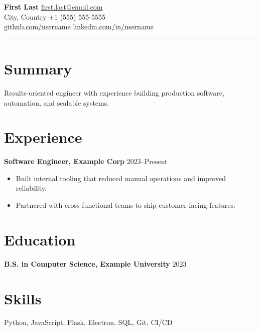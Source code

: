 \documentclass[11pt]{article}
\begin{document}
{\LARGE \textbf{First Last}} \hfill \href{mailto:first.last@email.com}{first.last@email.com} \\
City, Country \hfill +1 (555) 555-5555 \\
\href{https://github.com/username}{github.com/username} \hfill \href{https://linkedin.com/in/username}{linkedin.com/in/username}

\vspace{0.6em}
\hrule
\vspace{0.6em}

\section*{Summary}
Results-oriented engineer with experience building production software, automation, and scalable systems.

\section*{Experience}
\textbf{Software Engineer, Example Corp} \hfill 2023--Present \\
\begin{itemize}
  \item Built internal tooling that reduced manual operations and improved reliability.
  \item Partnered with cross-functional teams to ship customer-facing features.
\end{itemize}

\section*{Education}
\textbf{B.S. in Computer Science, Example University} \hfill 2023

\section*{Skills}
Python, JavaScript, Flask, Electron, SQL, Git, CI/CD
\end{document}
